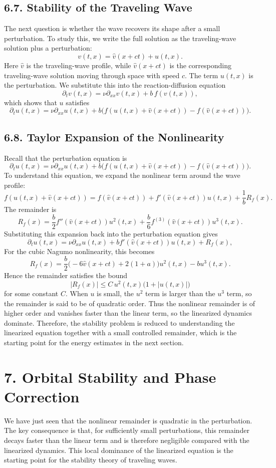 \documentclass[11pt]{article}
\theoremstyle{definition}
\theoremstyle{remark}
\begin{document}
\subsection*{6.7. Stability of the Traveling Wave}
The next question is whether the wave recovers its shape after a small perturbation. To study this, we write the full solution as the traveling-wave solution plus a perturbation:
\[
v(t,x)=\hat v(x+ct)+u(t,x).
\]
Here $\hat v$ is the traveling-wave profile, while $\hat v(x+ct)$ is the corresponding traveling-wave solution moving through space with speed $c$. The term $u(t,x)$ is the perturbation. We substitute this into the reaction-diffusion equation
\[
\partial_t v(t,x)=\nu\partial_{xx}v(t,x)+b\,f(v(t,x)),
\]
which shows that $u$ satisfies
\[
\partial_t u(t,x)
=
\nu\partial_{xx}u(t,x)
+
b\bigl(f(u(t,x)+\hat v(x+ct))-f(\hat v(x+ct))\bigr).
\]

\subsection*{6.8. Taylor Expansion of the Nonlinearity}
Recall that the perturbation equation is
\[
\partial_t u(t,x)
=
\nu\partial_{xx}u(t,x)
+
b\bigl(f(u(t,x)+\hat v(x+ct))-f(\hat v(x+ct))\bigr).
\]
To understand this equation, we expand the nonlinear term around the wave profile:
\[
f(u(t,x)+\hat v(x+ct))
=
f(\hat v(x+ct))+f'(\hat v(x+ct))u(t,x)+\frac{1}{b}R_f(x).
\]
The remainder is
\[
R_f(x)
=
\frac{b}{2}f''(\hat v(x+ct))u^2(t,x)
+
\frac{b}{6}f^{(3)}(\hat v(x+ct))u^3(t,x).
\]
Substituting this expansion back into the perturbation equation gives
\[
\partial_t u(t,x)
=
\nu\partial_{xx}u(t,x)+bf'(\hat v(x+ct))u(t,x)+R_f(x),
\]
For the cubic Nagumo nonlinearity, this becomes
\[
R_f(x)
=
\frac{b}{2}\bigl(-6\hat v(x+ct)+2(1+a)\bigr)u^2(t,x)-bu^3(t,x).
\]
Hence the remainder satisfies the bound
\[
|R_f(x)|\leq C\,u^2(t,x)\bigl(1+|u(t,x)|\bigr)
\]
for some constant $C$. When $u$ is small, the $u^2$ term is larger than the $u^3$ term, so the remainder is said to be of quadratic order. Thus the nonlinear remainder is of higher order and vanishes faster than the linear term, so the linearized dynamics dominate.
Therefore, the stability problem is reduced to understanding the linearized equation together with a small controlled remainder, which is the starting point for the energy estimates in the next section.

\section*{7. Orbital Stability and Phase Correction}
We have just seen that the nonlinear remainder is quadratic in the perturbation. The key consequence is that, for sufficiently small perturbations, this remainder decays faster than the linear term and is therefore negligible compared with the linearized dynamics. This local dominance of the linearized equation is the starting point for the stability theory of traveling waves.
\end{document}
